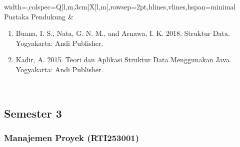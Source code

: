 \begin{longtblr}{width=\textwidth,colspec={Q[l,m,3cm]X[l,m]},rowsep=2pt,hlines,vlines,hspan=minimal}
Pustaka Pendukung & \begin{enumerate}\item Buana, I. S., Nata, G. N. M., and Arnawa, I. K. 2018. Struktur Data. Yogyakarta: Andi Publisher.\item Kadir, A. 2015. Teori dan Aplikasi Struktur Data Menggunakan Java. Yogyakarta: Andi Publisher.\end{enumerate} \\
\end{longtblr}

\subsection*{Semester 3}

\subsubsection*{Manajemen Proyek (RTI253001)}

